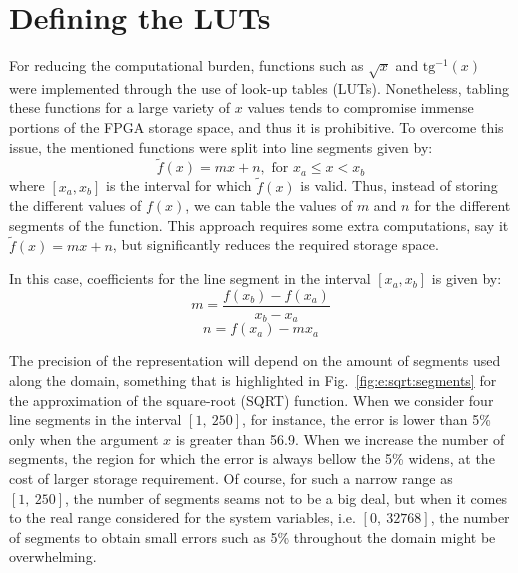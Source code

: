 \documentclass[12pt,a4paper]{article}
\begin{document}
\section{Defining the LUTs}


For reducing the computational burden, functions such as $\sqrt{x}$ and $\text{tg}^{-1}(x)$ were implemented through the use of look-up tables (LUTs). Nonetheless, tabling these functions for a large variety of $x$ values tends to compromise immense portions of the FPGA storage space, and thus it is prohibitive. To overcome this issue, the mentioned functions were split into line segments given by:
%
\begin{equation}
	\tilde{f}(x) = m x + n, \text{ for } x_a \leq x < x_b
\end{equation}
%
where $[x_a,x_b]$ is the interval for which $\tilde{f}(x)$ is valid. Thus, instead of storing the different values of $f(x)$, we can table the values of $m$ and $n$ for the different segments of the function. This approach requires some extra computations, say it $\tilde{f}(x) = mx+n$, but significantly reduces the required storage space.



In this case, coefficients for the line segment in the interval $[x_a,x_b]$ is given by:
%
\begin{equation}
	m = \frac{f(x_b)-f(x_a)}{x_b - x_a}
\end{equation}  
%
\begin{equation}
	n = f(x_a) - m x_a
\end{equation}  


The precision of the representation will depend on the amount of segments used along the domain, something that is highlighted in Fig.~\ref{fig:e:sqrt:segments} for the approximation of the square-root (SQRT) function. When we consider four line segments in the interval $[1,~250]$, for instance, the error is lower than 5\% only when the argument $x$ is greater than 56.9. When we increase the number of segments, the region for which the  error is always bellow the 5\% widens, at the cost of larger storage requirement. Of course, for such a narrow range as $[1,~250]$, the number of segments seams not to be a big deal, but when it comes to the real range considered for the system variables, i.e. $[0,~32768]$, the number of segments to obtain small errors such as 5\% throughout the domain might be overwhelming. 
\end{document}
